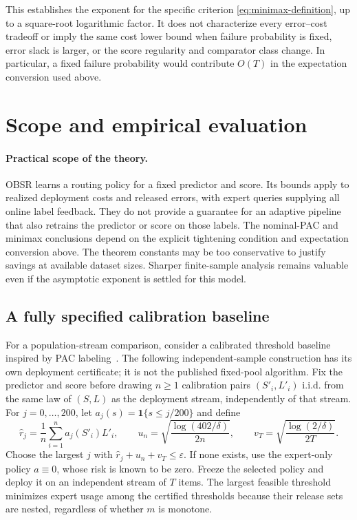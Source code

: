 \documentclass[11pt]{article}
\theoremstyle{remark}
\newcommand{\ind}{\mathbf 1}
\newcommand{\eps}{\varepsilon}
\begin{document}
This establishes the exponent for the specific criterion
\eqref{eq:minimax-definition}, up to a square-root logarithmic factor.
It does not characterize every error--cost tradeoff or imply the same
cost lower bound when failure probability is fixed, error slack is
larger, or the score regularity and comparator class change. In
particular, a fixed failure probability would contribute $O(T)$ in
the expectation conversion used above.

\section{Scope and empirical evaluation}
\label{sec:research}

\paragraph{Practical scope of the theory.}
OBSR learns a routing policy for a fixed predictor and score. Its bounds
apply to realized deployment costs and released errors, with expert
queries supplying all online label feedback. They do not provide a
guarantee for an adaptive pipeline that also retrains the predictor or
score on those labels. The nominal-PAC and minimax conclusions depend
on the explicit tightening condition and expectation conversion above.
The theorem constants may be too conservative to justify savings at
available dataset sizes. Sharper finite-sample analysis remains valuable
even if the asymptotic exponent is settled for this model.

\subsection{A fully specified calibration baseline}

For a population-stream comparison, consider a calibrated threshold
baseline inspired by PAC labeling~\cite{paclabels}. The following
independent-sample construction has its own deployment certificate;
it is not the published fixed-pool algorithm. Fix the predictor and score
before drawing $n\ge1$ calibration pairs $(S'_i,L'_i)$ i.i.d. from the
same law of $(S,L)$ as the deployment stream, independently of that stream.
For $j=0,\ldots,200$, let $a_j(s)=\ind\{s\le j/200\}$ and define
\begin{equation}
 \widehat r_j=\frac1n\sum_{i=1}^n a_j(S'_i)L'_i,\qquad
 u_n=\sqrt{\frac{\log(402/\delta)}{2n}},\qquad
 v_T=\sqrt{\frac{\log(2/\delta)}{2T}}.
 \label{eq:calibration-baseline}
\end{equation}
Choose the largest $j$ with $\widehat r_j+u_n+v_T\le\eps$.
If none exists, use the expert-only policy $a\equiv0$, whose risk is
known to be zero. Freeze the selected policy and deploy it on an
independent stream of $T$ items. The largest feasible threshold minimizes
expert usage among the certified thresholds because their release sets
are nested, regardless of whether $m$ is monotone.
\end{document}
